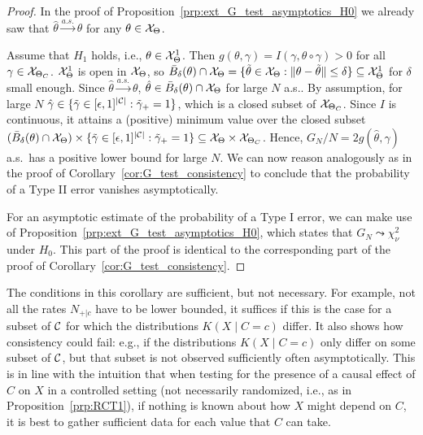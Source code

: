 \begin{proof}
In the proof of Proposition~\ref{prp:ext_G_test_asymptotics_H0}
we already saw that $\hat\theta \stackrel{a.s.}{\to} \theta$ for any $\theta \in \mathcal{X}_\Theta$.

Assume that $H_1$ holds, i.e., $\theta \in \mathcal{X}_\Theta^1$.
Then $g(\theta,\gamma) = I(\gamma, \theta \circ \gamma) > 0$ for all $\gamma \in \mathcal{X}_{\Theta_C}$.
$\mathcal{X}_\Theta^1$ is open in $\mathcal{X}_\Theta$, so $\bar B_{\delta}(\theta) \cap \mathcal{X}_\Theta = \{\tilde{\theta} \in \mathcal{X}_\Theta : \lVert \theta - \tilde{\theta} \rVert \le \delta \} \subseteq \mathcal{X}_\Theta^1$ for $\delta$ small enough.
Since $\hat\theta \stackrel{a.s.}{\to} \theta$, $\hat\theta \in \bar B_{\delta}(\theta) \cap \mathcal{X}_\Theta$ for large $N$ a.s..
By assumption, for large $N$ $\hat\gamma \in \{\tilde{\gamma} \in [\epsilon,1]^{|\mathcal{C}|} : \tilde{\gamma}_+ = 1\}$,
which is a closed subset of $\mathcal{X}_{\Theta_C}$.
Since $I$ is continuous, it attains a (positive) minimum value over the closed subset
$(\bar B_{\delta}(\theta) \cap \mathcal{X}_\Theta) \times \{\tilde{\gamma} \in [\epsilon,1]^{|\mathcal{C}|} : \tilde{\gamma}_+ = 1\} \subseteq \mathcal{X}_\Theta \times \mathcal{X}_{\Theta_C}$.
Hence, $G_N / N = 2g(\hat\theta,\hat\gamma)$ a.s.\ has a positive lower bound for large $N$.
We can now reason analogously as in the proof of Corollary~\ref{cor:G_test_consistency} to conclude that
the probability of a Type II error vanishes asymptotically.

For an asymptotic estimate of the probability of a Type I error,
we can make use of Proposition~\ref{prp:ext_G_test_asymptotics_H0},
which states that $G_N \leadsto \chi_{\nu}^2$ under $H_0$. 
This part of the proof is identical to the corresponding part of the proof of Corollary~\ref{cor:G_test_consistency}.
\end{proof}
The conditions in this corollary are sufficient, but not necessary. For example,
not all the rates $N_{+|c}$ have to be lower bounded, it suffices if this is
the case for a subset of $\mathcal{C}$ for which the distributions $K(X \mid C=c)$ differ.
It also shows how consistency could fail: e.g., if the distributions
$K(X \mid C=c)$ only differ on some subset of $\mathcal{C}$, but that subset is not 
observed sufficiently often asymptotically. This is in line with the intuition that
when testing for the presence of a causal effect of $C$ on $X$ in a controlled
setting (not necessarily randomized, i.e., as in Proposition~\ref{prp:RCT1}), if
nothing is known about how $X$ might depend on $C$, it is best to gather sufficient
data for each value that $C$ can take.

